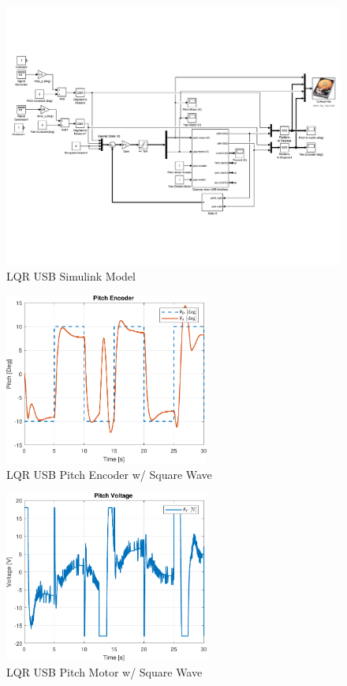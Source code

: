 \documentclass[fontsize=11pt, %
                             paper=letter, %
                             openany, %
                             captions=tableheading,
                             index=totoc,
                             hyperref]{labbook}
\begin{document}
\begin{addmargin}[0cm]{0cm}
\begin{figure}[h]
  \centering
  \includegraphics[width=1\textwidth]{figs/img/LQR_USB}
  \caption{LQR USB Simulink Model}
  \label{fig:LQR_USB}
\end{figure}

\begin{figure}[h]
  \centering
  \includegraphics[width=0.6\textwidth]{figs/matlab/LQR/P_USB/Pitch_Pos_LQR_USB_SQU}
  \caption{LQR USB Pitch Encoder w/ Square Wave}
  \label{fig:Pitch_Pos_LQR_USB_SQU}
\end{figure}

\begin{figure}[h]
  \centering
  \includegraphics[width=0.6\textwidth]{figs/matlab/LQR/P_USB/Pitch_Volt_LQR_USB_SQU}
  \caption{LQR USB Pitch Motor w/ Square Wave}
  \label{fig:Pitch_Volt_LQR_USB_SQU}
\end{figure}


\end{addmargin}
\end{document}
